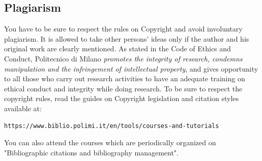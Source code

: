\documentclass[11pt,a4paper]{article}
\begin{document}
\subsection{Plagiarism}
You have to be sure to respect the rules on Copyright and avoid involuntary plagiarism.
It is allowed to take other persons' ideas only if the author and his original work are clearly mentioned.
As stated in the Code of Ethics and Conduct, Politecnico di Milano \textit{promotes the integrity of research,
condemns manipulation and the infringement of intellectual property}, and gives opportunity to all those
who carry out research activities to have an adequate training on ethical conduct and integrity while doing research.
To be sure to respect the copyright rules, read the guides on Copyright legislation and citation styles available
at:
\begin{verbatim}
https://www.biblio.polimi.it/en/tools/courses-and-tutorials
\end{verbatim}
You can also attend the courses which are periodically organized on "Bibliographic citations and bibliography management".

\end{document}
